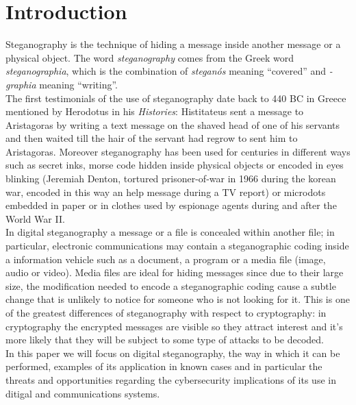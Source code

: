 \documentclass[../../main.tex]{subfiles}
\begin{document}
\section{Introduction}

Steganography is the technique of hiding a message inside another message or a physical object.
The word \textit{steganography} comes from the Greek word \textit{steganographia}, which is the combination of 
\textit{steganós} meaning ``covered'' and \textit{-graphia} meaning ``writing''.
\\
The first testimonials of the use of steganography date back to 440 BC in Greece mentioned by Herodotus in his
\emph{Histories}: Histitateus sent a message to Aristagoras by writing a text message on the shaved head of one of his
servants and then waited till the hair of the servant had regrow to sent him to Aristagoras.
Moreover steganography has been used for centuries in different ways such as secret inks, morse code hidden inside
physical objects or encoded in eyes blinking (Jeremiah Denton, tortured prisoner-of-war in 1966 during the korean
war, encoded in this way an help message during a TV report) or microdots embedded in paper or in clothes used by
espionage agents during and after the World War II.
\\
In digital steganography a message or a file is concealed within another file; in particular, electronic communications
may contain a steganographic coding inside a information vehicle such as a document, a program or a media file (image,
audio or video).
Media files are ideal for hiding messages since due to their large size, the modification needed to encode a
steganographic coding cause a subtle change that is unlikely to notice for someone who is not looking for it.
This is one of the greatest differences of steganography with respect to cryptography: in cryptography the encrypted
messages are visible so they attract interest and it's more likely that they will be subject to some type of attacks to
be decoded.
\\
In this paper we will focus on digital steganography, the way in which it can be performed, examples of its application
in known cases and in particular the threats and opportunities regarding the cybersecurity implications of its use in
ditigal and communications systems.

\pagebreak
\end{document}
